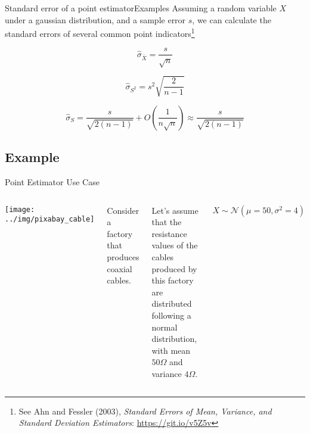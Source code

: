 \begin{frame}{Standard error of a point estimator}{Examples}
  Assuming a random variable $X$ under a gaussian distribution, and a sample error $s$, we can calculate the standard errors of several common point indicators\footnote{See Ahn and Fessler (2003), \textit{Standard Errors of Mean, Variance, and Standard Deviation Estimators}: \url{https://git.io/v5Z5v}}

\begin{equation*}
\hat{\sigma}_{\bar{X}} = \frac{s}{\sqrt{n}}
\end{equation*}

\begin{equation*}
\hat{\sigma}_{S^2} = s^2\sqrt{\frac{2}{n-1}}
\end{equation*}

\begin{equation*}
\hat{\sigma}_{S} = \frac{s}{\sqrt{2(n-1)}} + O\left(\frac{1}{n\sqrt{n}}\right)\approx \frac{s}{\sqrt{2(n-1)}}
\end{equation*}\bigskip
\end{frame}

\subsection{Example}
\begin{frame}{Point Estimator Use Case}
  \begin{columns}[T]
    \hspace{.05\textwidth}\texttt{[image: ../img/pixabay\_cable]}

    Consider a factory that produces coaxial cables.\bigskip

    Let's assume that the resistance values of the cables produced by this factory
    are distributed following a normal distribution, with mean $50\Omega$ and variance $4\Omega$.\bigskip

    $X\sim\mathcal{N}\left(\mu=50,\sigma^2=4\right)$
\end{columns}
\end{frame}

